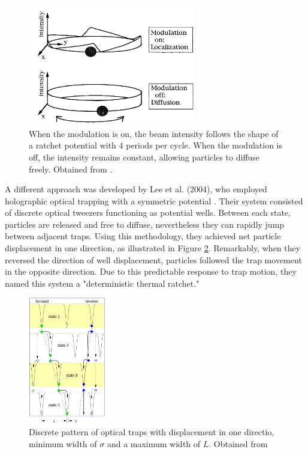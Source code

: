 \begin{figure}[h]
  \begin{center}
    \includegraphics[width=0.65\textwidth]{figures/FaucheuxExperiment.png}
  \end{center}
  \caption[Optical thermal ratchet by Faucheux]{When the modulation is on, the beam intensity follows the shape of a ratchet potential with 4 periods per cycle. When the modulation is off, the intensity remains constant, allowing particles to diffuse freely. Obtained from \cite{faucheux1995optical}.}\label{fig:faucheuxexperiment}
\end{figure}

A different approach was developed by Lee et al. (2004), who employed holographic optical trapping with a symmetric potential \cite{lee2005observation}. Their system consisted of discrete optical tweezers functioning as potential wells. Between each state, particles are released and free to diffuse, nevertheless they can rapidly jump between adjacent traps. Using this methodology, they achieved net particle displacement in one direction, as illustrated in Figure \ref{fig:deterministicthermalratchet}. Remarkably, when they reversed the direction of well displacement, particles followed the trap movement in the opposite direction. Due to this predictable response to trap motion, they named this system a "deterministic thermal ratchet."


 \begin{figure}[h]
  \begin{center}
    \includegraphics[width=0.30\textwidth]{figures/DeterministicThermalRatchet.png}
  \end{center}
  \caption[Deterministic thermal ratchet by Lee et al.]{Discrete pattern of optical traps with displacement in one directio, minimum width of $\sigma$ and a maximum width of $L$. Obtained from \cite{lee2005observation}}\label{fig:deterministicthermalratchet}
 \end{figure}

